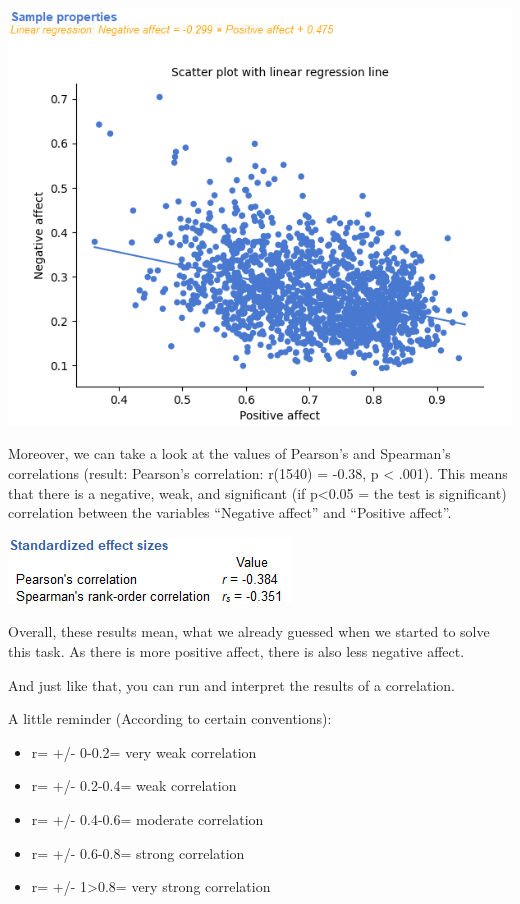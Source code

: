 \documentclass[
]{book}
\begin{document}
\includegraphics{img/ch3/vpposnegeff3regrline.png}

Moreover, we can take a look at the values of Pearson's and Spearman's correlations (result: Pearson's correlation: r(1540) = -0.38, p \textless{} .001). This means that there is a negative, weak, and significant (if p\textless0.05 = the test is significant) correlation between the variables ``Negative affect'' and ``Positive affect''.

\includegraphics{img/ch3/standardes.png}

Overall, these results mean, what we already guessed when we started to solve this task. As there is more positive affect, there is also less negative affect.

And just like that, you can run and interpret the results of a correlation.

A little reminder (According to certain conventions):

\begin{itemize}
\item
  r= +/- 0-0.2= very weak correlation
\item
  r= +/- 0.2-0.4= weak correlation
\item
  r= +/- 0.4-0.6= moderate correlation
\item
  r= +/- 0.6-0.8= strong correlation
\item
  r= +/- 1\textgreater0.8= very strong correlation
\end{itemize}
\end{document}
